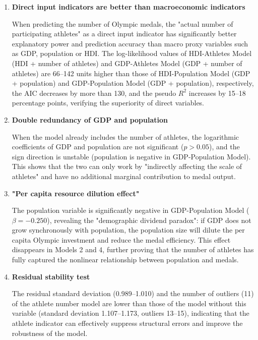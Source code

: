 \documentclass[11pt,twoside]{article}
\numberwithin{Theorem}{section}
\numberwithin{Definition}{section}
\numberwithin{Lemma}{section}
\numberwithin{Algorithm}{section}
\numberwithin{equation}{section}
\begin{document}
\begin{enumerate}
    \item \textbf{Direct input indicators are better than macroeconomic indicators}
    
    When predicting the number of Olympic medals, the "actual number of participating athletes" as a direct input indicator has significantly better explanatory power and prediction accuracy than macro proxy variables such as GDP, population or HDI. The log-likelihood values of HDI-Athletes Model (HDI + number of athletes) and GDP-Athletes Model (GDP + number of athletes) are 66--142 units higher than those of HDI-Population Model (GDP + population) and GDP-Population Model (GDP + population), respectively, the AIC decreases by more than 130, and the pseudo $R^2$ increases by 15--18 percentage points, verifying the superiority of direct variables.
    
    \item \textbf{Double redundancy of GDP and population}
    
    When the model already includes the number of athletes, the logarithmic coefficients of GDP and population are not significant ($p>0.05$), and the sign direction is unstable (population is negative in GDP-Population Model). This shows that the two can only work by "indirectly affecting the scale of athletes" and have no additional marginal contribution to medal output.
    
    \item \textbf{"Per capita resource dilution effect"}
    
    The population variable is significantly negative in GDP-Population Model ($\beta=-0.250$), revealing the "demographic dividend paradox": if GDP does not grow synchronously with population, the population size will dilute the per capita Olympic investment and reduce the medal efficiency. This effect disappears in Models 2 and 4, further proving that the number of athletes has fully captured the nonlinear relationship between population and medals.
    
    \item \textbf{Residual stability test}
    
    The residual standard deviation (0.989--1.010) and the number of outliers (11) of the athlete number model are lower than those of the model without this variable (standard deviation 1.107--1.173, outliers 13--15), indicating that the athlete indicator can effectively suppress structural errors and improve the robustness of the model.
\end{enumerate}
\end{document}

